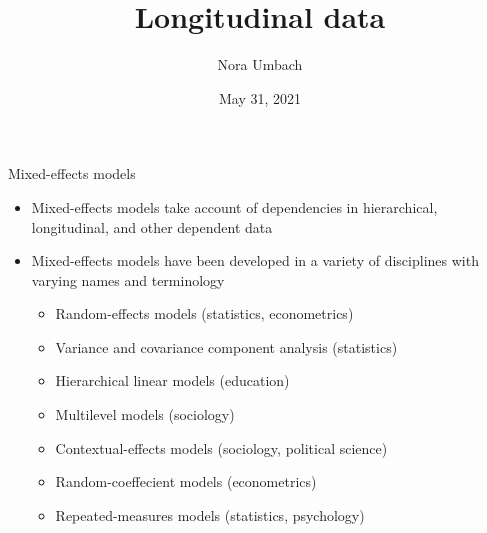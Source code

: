 \documentclass{beamer}
\title{Longitudinal data}
\author{Nora Umbach%
}
\date{May 31, 2021}
\begin{document}
\begin{frame}{}
\thispagestyle{empty}
\titlepage
\end{frame}



\begin{frame}{Mixed-effects models}
\begin{itemize}
  \item Mixed-effects models take account of dependencies in hierarchical,
    longitudinal, and other dependent data
  \item Mixed-effects models have been developed in a variety of
    disciplines with varying names and terminology
  \begin{itemize}
    \item Random-effects models (statistics, econometrics)
    \item Variance and covariance component analysis (statistics)
    \item Hierarchical linear models (education)
    \item Multilevel models (sociology)
    \item Contextual-effects models (sociology, political science)
    \item Random-coeffecient models (econometrics)
    \item Repeated-measures models (statistics, psychology)
  \end{itemize}
\end{itemize}
  \begin{flushright}{\footnotesize \citet{Fox2016}}\end{flushright}
\end{frame}


% 
% 
\end{document}
